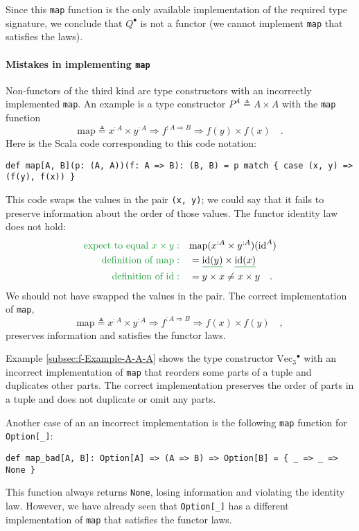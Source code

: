 Since this \lstinline!map! function is the only available implementation
of the required type signature, we conclude that $Q^{\bullet}$ is
not a functor (we cannot implement \lstinline!map! that satisfies
the laws).

\paragraph{Mistakes in implementing \lstinline!map!}

Non-functors of the third kind are type constructors with an incorrectly
implemented \lstinline!map!. An example is a type constructor $P^{A}\triangleq A\times A$
with the \lstinline!map! function
\[
\text{map}\triangleq x^{:A}\times y^{:A}\Rightarrow f^{:A\Rightarrow B}\Rightarrow f(y)\times f(x)\quad.
\]
Here is the Scala code corresponding to this code notation:
\begin{lstlisting}
def map[A, B](p: (A, A))(f: A => B): (B, B) = p match { case (x, y) => (f(y), f(x)) }
\end{lstlisting}
This code swaps the values in the pair \lstinline!(x, y)!; we could
say that it fails to preserve information about the order of those
values. The functor identity law does not hold:
\begin{align*}
{\color{greenunder}\text{expect to equal }x\times y:}\quad & \text{map}(x^{:A}\times y^{:A})(\text{id}^{A})\\
{\color{greenunder}\text{definition of }\text{map}:}\quad & =\gunderline{\text{id}(y)}\times\gunderline{\text{id}(x)}\\
{\color{greenunder}\text{definition of }\text{id}:}\quad & =y\times x\neq x\times y\quad.
\end{align*}
We should not have swapped the values in the pair. The correct implementation
of \lstinline!map!,
\[
\text{map}\triangleq x^{:A}\times y^{:A}\Rightarrow f^{:A\Rightarrow B}\Rightarrow f(x)\times f(y)\quad,
\]
preserves information and satisfies the functor laws.

Example \ref{subsec:f-Example-A-A-A} shows the type constructor $\text{Vec}_{3}{}^{\bullet}$
with an incorrect implementation of \lstinline!map! that reorders
some parts of a tuple and duplicates other parts. The correct implementation
preserves the order of parts in a tuple and does not duplicate or
omit any parts.

Another case of an an incorrect implementation is the following \lstinline!map!
function for \lstinline!Option[_]!:
\begin{lstlisting}
def map_bad[A, B]: Option[A] => (A => B) => Option[B] = { _ => _ => None }
\end{lstlisting}
This function always returns \lstinline!None!, losing information
and violating the identity law. However, we have already seen that
\lstinline!Option[_]! has a different implementation of \lstinline!map!
that satisfies the functor laws.

